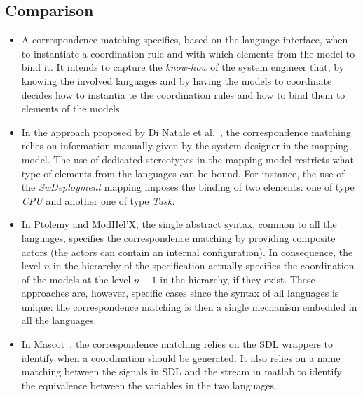 	\subsection{Comparison}
		\begin{itemize}
			\item A correspondence matching specifies, based on the language interface, when to instantiate a coordination rule and with which elements from the model to bind it.
			It intends to capture the \emph{know-how} of the system engineer that, by knowing the involved languages and by having the models to coordinate decides how to instantia           te the coordination rules and how to bind them to elements of the models.
			
			\item In the approach proposed by Di Natale et al.~\cite{dinatale}, the correspondence matching relies on information manually given by the system designer in the mapping model. The use of dedicated stereotypes in the mapping model restricts what type of elements from the languages can be bound. For instance, the use of the \emph{SwDeployment} mapping imposes the binding of two elements: one of type \emph{CPU} and another one of type \emph{Task}. 			
			\item In Ptolemy and ModHel'X, the single abstract syntax, common to all the languages, specifies the correspondence matching by providing composite actors (\ie the actors can contain an internal configuration). In consequence, the level $n$ in the hierarchy of the specification actually specifies the coordination of the models at the level $n-1$ in the hierarchy, if they exist. These approaches are, however, specific cases since the syntax of all languages is unique: the correspondence matching is then a single mechanism embedded in all the languages.
			
			\item In Mascot~\cite{mascotbib}, the correspondence matching relies on the SDL wrappers to identify when a coordination should be generated. It also relies on a name matching between the signals in SDL and the stream in matlab to identify the equivalence between the variables in the two languages. 
		\end{itemize}

